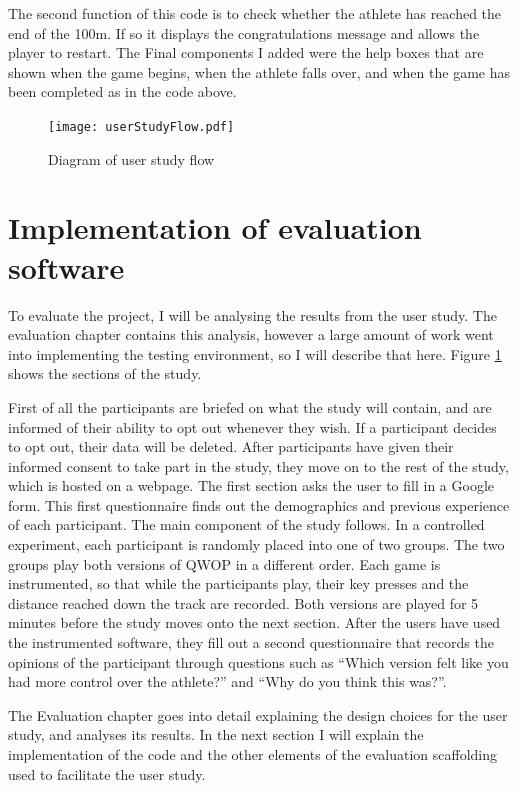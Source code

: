 \documentclass[12pt,a4paper,twoside,openright]{report}
\begin{document}
The second function of this code is to check whether the athlete has reached the end of the 100m. If so it displays the congratulations message and allows the player to restart. The Final components I added were the help boxes that are shown when the game begins, when the athlete falls over, and when the game has been completed as in the code above.


\begin{figure}[tbh]
\centerline{\texttt{[image: userStudyFlow.pdf]}}
\caption{Diagram of user study flow}
\label{flow}
\end{figure}

\section{Implementation of evaluation software}
\label{studyimpl}

To evaluate the project, I will be analysing the results from the user study. 
The evaluation chapter contains this analysis, however a large amount of work went into implementing the testing environment, so I will describe that here.
Figure \ref{flow} shows the sections of the study.

First of all the participants are briefed on what the study will contain, and are informed of their ability to opt out whenever they wish. If a participant decides to opt out, their data will be deleted.
After participants have given their informed consent to take part in the study, they move on to the rest of the study, which is hosted on a webpage. The first section asks the user to fill in a Google form.
This first questionnaire finds out the demographics and previous experience of each participant. 
The main component of the study follows.
In a controlled experiment, each participant is randomly placed into one of two groups. The two groups play both versions of QWOP in a different order.
Each game is instrumented, so that while the participants play, their key presses and the distance reached down the track are recorded. Both versions are played for 5 minutes before the study moves onto the next section.
After the users have used the instrumented software, they fill out a second questionnaire that records the opinions of the participant through questions such as 
``Which version felt like you had more control over the athlete?'' and
``Why do you think this was?''.

The Evaluation chapter goes into detail explaining the design choices for the user study, and analyses its results. In the next section I will explain the implementation of the code and the other elements of the evaluation scaffolding used to facilitate the user study.
\end{document}
